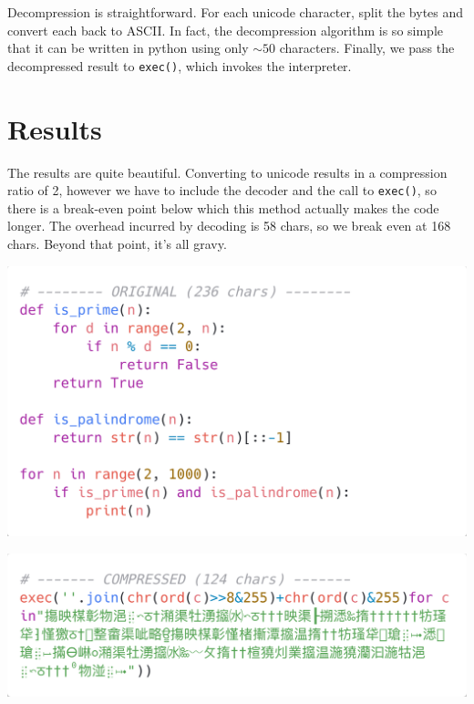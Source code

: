 \documentclass{article}
\begin{document}
\medskip

Decompression is straightforward. For each unicode character, split the bytes and convert each back to ASCII. In fact, the decompression algorithm is so simple that it can be written in python using only $\sim50$ characters. Finally, we pass the decompressed result to \texttt{exec()}, which invokes the interpreter.


\section*{Results}

The results are quite beautiful. Converting to unicode results in a compression ratio of 2, however we have to include the decoder and the call to \texttt{exec()}, so there is a break-even point below which this method actually makes the code longer. The overhead incurred by decoding is 58 chars, so we break even at 168 chars. Beyond that point, it's all gravy.

\medskip

\setlength{\columnseprule}{0.4pt}
\renewcommand{\columnseprulecolor}{\color{darkgray}}

\begin{tcolorbox}[boxrule=0.4pt, title=Example 1: Print all palindromic primes under 1000]
    \begin{multicols}{2}
    \includegraphics*[width=\linewidth]{figures/palindromic_primes_before.png}

    \columnbreak

    \includegraphics*[width=\linewidth]{figures/palindromic_primes_after.png}
    \end{multicols}
\end{tcolorbox}
\end{document}
